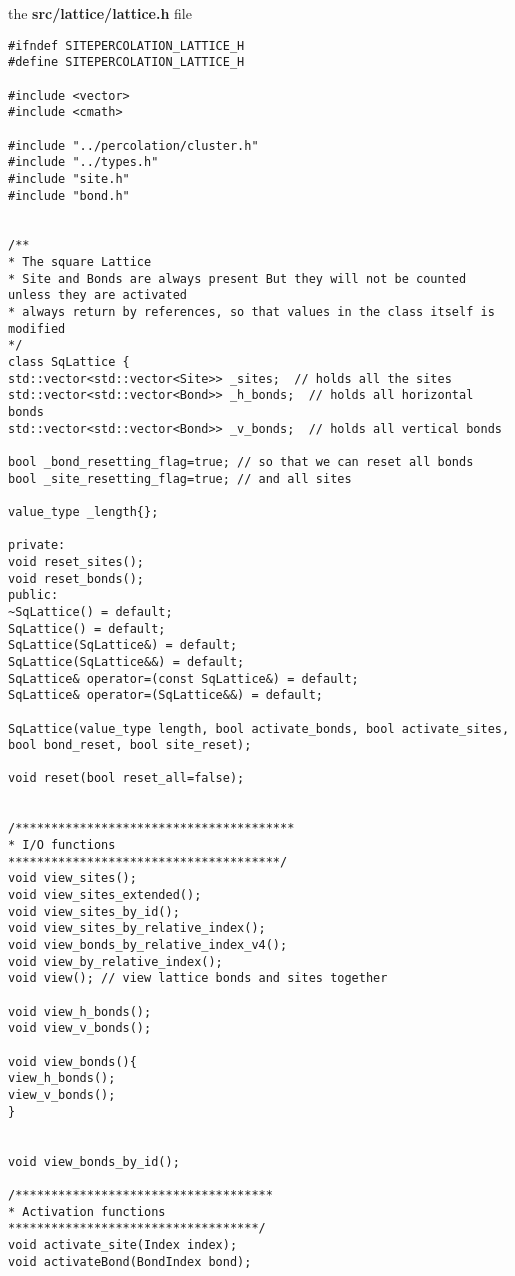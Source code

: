 
the \textbf{src/lattice/lattice.h} file
\begin{lstlisting}[style=CStyle]
#ifndef SITEPERCOLATION_LATTICE_H
#define SITEPERCOLATION_LATTICE_H

#include <vector>
#include <cmath>

#include "../percolation/cluster.h"
#include "../types.h"
#include "site.h"
#include "bond.h"


/**
* The square Lattice
* Site and Bonds are always present But they will not be counted unless they are activated
* always return by references, so that values in the class itself is modified
*/
class SqLattice {
std::vector<std::vector<Site>> _sites;  // holds all the sites
std::vector<std::vector<Bond>> _h_bonds;  // holds all horizontal bonds
std::vector<std::vector<Bond>> _v_bonds;  // holds all vertical bonds

bool _bond_resetting_flag=true; // so that we can reset all bonds
bool _site_resetting_flag=true; // and all sites

value_type _length{};

private:
void reset_sites();
void reset_bonds();
public:
~SqLattice() = default;
SqLattice() = default;
SqLattice(SqLattice&) = default;
SqLattice(SqLattice&&) = default;
SqLattice& operator=(const SqLattice&) = default;
SqLattice& operator=(SqLattice&&) = default;

SqLattice(value_type length, bool activate_bonds, bool activate_sites, bool bond_reset, bool site_reset);

void reset(bool reset_all=false);


/***************************************
* I/O functions
**************************************/
void view_sites();
void view_sites_extended();
void view_sites_by_id();
void view_sites_by_relative_index();
void view_bonds_by_relative_index_v4();
void view_by_relative_index();
void view(); // view lattice bonds and sites together

void view_h_bonds();
void view_v_bonds();

void view_bonds(){
view_h_bonds();
view_v_bonds();
}


void view_bonds_by_id();

/************************************
* Activation functions
***********************************/
void activate_site(Index index);
void activateBond(BondIndex bond);


\end{lstlisting}
